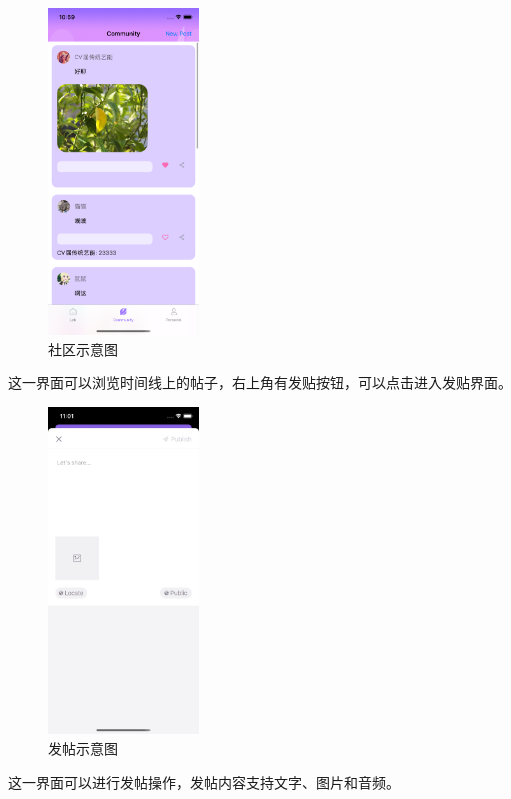 \begin{figure}
\includegraphics[width=4cm]{figures/社区.png}
\caption{社区示意图}
\label{fig:my_label}
\end{figure}


这一界面可以浏览时间线上的帖子，右上角有发贴按钮，可以点击进入发贴界面。


\begin{figure}
\includegraphics[width=4cm]{figures/发贴.png}
\caption{发帖示意图}
\label{fig:my_label}
\end{figure}

这一界面可以进行发帖操作，发帖内容支持文字、图片和音频。


